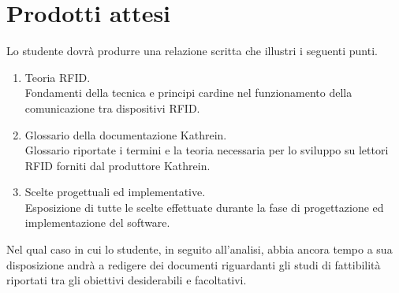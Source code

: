 \section*{Prodotti attesi}
Lo studente dovrà produrre una relazione scritta che illustri i seguenti punti.
\begin{enumerate}
    \item Teoria RFID. \\
    Fondamenti della tecnica e principi cardine nel funzionamento della comunicazione tra dispositivi RFID.
    
    \item Glossario della documentazione Kathrein. \\
    Glossario riportate i termini e la teoria necessaria per lo sviluppo su lettori RFID forniti dal produttore Kathrein.
    
    \item Scelte progettuali ed implementative. \\
    Esposizione di tutte le scelte effettuate durante la fase di progettazione ed implementazione del software.
\end{enumerate}

Nel qual caso in cui lo studente, in seguito all'analisi, abbia ancora tempo a sua disposizione andrà a redigere
dei documenti riguardanti gli studi di fattibilità riportati tra gli obiettivi desiderabili e facoltativi.
